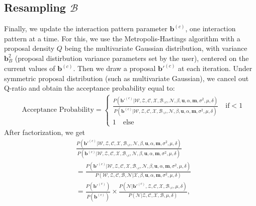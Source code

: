 \documentclass[a4paper]{article}
\begin{document}
 \subsection{Resampling $\mathcal{B}$}  \label{subsec: Resampling B}
 Finally, we update the interaction pattern parameter $\boldsymbol{b}^{(c)}$, one interaction pattern at a time. For this, we use the Metropolis-Hastings algorithm with a proposal density $Q$ being the multivariate Gaussian distribution, with variance $\boldsymbol{b}^2_B$ (proposal distirbution variance parameters set by the
 user), centered on the current values of $\boldsymbol{b}^{(c)}$. Then we draw a proposal $\boldsymbol{b}'^{(c)}$ at each iteration. Under symmetric proposal distribution (such as multivariate Gaussian), we cancel out Q-ratio and obtain the acceptance probability equal to:
 \begin{equation}
 \begin{split}
 & \mbox{Acceptance Probability}=
 \begin{cases}  \frac{P(\boldsymbol{b}'^{(c)}|\mathcal{W}, \mathcal{Z}, \mathcal{C}, \mathcal{X}, \mathcal{B}_{\backslash c}, \mathcal{N},\beta, \boldsymbol{u}, \alpha, \boldsymbol{m},  \sigma^2, \mu, \delta)}{P(\boldsymbol{b}^{(c)}|\mathcal{W}, \mathcal{Z}, \mathcal{C}, \mathcal{X}, \mathcal{B}_{\backslash c}, \mathcal{N},\beta, \boldsymbol{u}, \alpha, \boldsymbol{m},  \sigma^2, \mu, \delta)}\quad\text{if}  <1\\
 1 \quad \text{else}
 \end{cases}
 \end{split}
 \end{equation}
 After factorization, we get
 \begin{equation}
 \begin{aligned}
&\frac{P(\boldsymbol{b}'^{(c)}|\mathcal{W}, \mathcal{Z}, \mathcal{C}, \mathcal{X}, \mathcal{B}_{\backslash c},  \mathcal{N},\beta, \boldsymbol{u}, \alpha, \boldsymbol{m},  \sigma^2, \mu, \delta)}{P(\boldsymbol{b}^{(c)}|\mathcal{W}, \mathcal{Z}, \mathcal{C}, \mathcal{X},  \mathcal{B}_{\backslash c}, \mathcal{N},\beta, \boldsymbol{u}, \alpha, \boldsymbol{m},  \sigma^2, \mu, \delta)} \\&=\frac{P(\boldsymbol{b}'^{(c)}|\mathcal{W}, \mathcal{Z}, \mathcal{C}, \mathcal{X}, \mathcal{B}_{\backslash c},  \mathcal{N},\beta, \boldsymbol{u}, \alpha, \boldsymbol{m},  \sigma^2, \mu, \delta)}{P(\mathcal{W}, \mathcal{Z}, \mathcal{C}, \mathcal{B}, \mathcal{N} |\mathcal{X},  \beta, \boldsymbol{u}, \alpha, \boldsymbol{m},  \sigma^2, \mu, \delta)}\\&=\frac{P(\boldsymbol{b}'^{(c)})}{P(\boldsymbol{b}^{(c)})}\times\frac{P(\mathcal{N}|\boldsymbol{b}'^{(c)}, \mathcal{Z}, \mathcal{C}, \mathcal{X}, \mathcal{B}_{\backslash c}, \mu, \delta)}{P(\mathcal{N}|\mathcal{Z}, \mathcal{C}, \mathcal{X}, \mathcal{B}, \mu, \delta)},
 \end{aligned}
 \end{equation}
\end{document}
